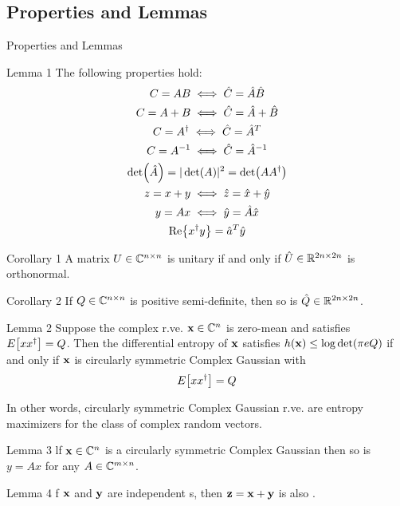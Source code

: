 \subsection{Properties and Lemmas}
\begin{frame}[allowframebreaks]{Properties and Lemmas}
\begin{block}{Lemma 1}
	The following properties hold:
	\begin{subequations}
	\begin{gather}
	C=AB \iff \hat{C} = \hat{A}\hat{B}\\
	C = A+B \iff \hat{C} = \hat{A} + \hat{B}\\
	C = A^\dagger \iff \hat{C}=\hat{A}^T\\
	C=A^{-1} \iff \hat{C} = \hat{A}^{-1}\\
	\det(\hat{A}) = |\det(A)|^2 = \det(A A^\dagger)\\
	z = x+y \iff \hat{z} = \hat{x}+\hat{y}\\
	y=Ax \iff \hat{y} = \hat{A}\hat{x}\\
	\Re{\ensuremath{x^\dagger}y} = \hat{a}^T\hat{y}
	\end{gather}
	\end{subequations}
\end{block}

\framebreak

\begin{block}{Corollary 1}
A matrix $U\in \mathbb{C}^{n\times n}$ is unitary if and only if $\hat{U}\in \mathbb{R}^{2n\times 2n}$ is orthonormal.
\end{block}
\begin{block}{Corollary 2}
If $Q\in \mathbb{C}^{n\times n}$ is positive semi-definite, then so is $\hat{Q}\in \mathbb{R}^{2n\times 2n}$.
\end{block}
\begin{alertblock}{Lemma 2}
Suppose the complex r.ve. $\vb{x}\in \mathbb{C}^{n}$ is
zero-mean and satisfies $E\qty[xx^\dagger]=Q$. Then the differential entropy of $\vb{x}$ satisfies $h(\vb{x}) \leq \log\det(\pi e Q)$ if and only if $\vb{x}$ is circularly symmetric Complex Gaussian with
$$E\qty[xx^\dagger] = Q$$
\end{alertblock}
In other words, circularly symmetric Complex Gaussian r.ve. are entropy maximizers for the class of complex random vectors.

\framebreak

\begin{block}{Lemma 3}
lf $\vb{x}\in \mathbb{C}^{n}$ is a circularly symmetric Complex Gaussian then so is $y = Ax$ for any $A \in \mathbb{C}^{m\times n}$.
\end{block}
\begin{block}{Lemma 4}\label{lemma:4}
	f $\vb{x}$ and $\vb{y}$ are independent {\cscg s}, then $\vb{z}=\vb{x}+\vb{y}$ is also \cscg.
\end{block}

\end{frame}

